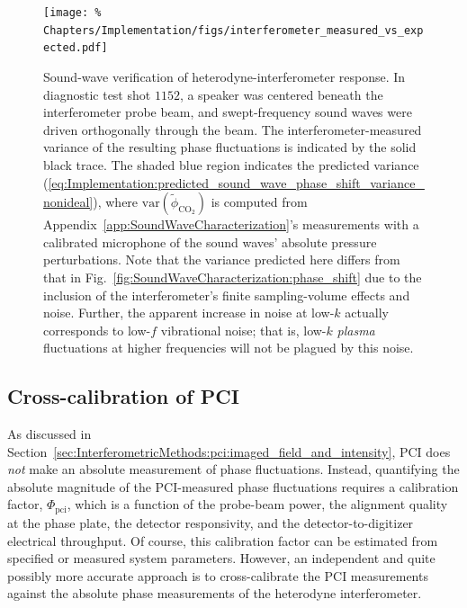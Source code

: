 \begin{figure}
  \centering
  \texttt{[image: \%
    Chapters/Implementation/figs/interferometer\_measured\_vs\_expected.pdf]}
  \caption[Sound-wave verification of heterodyne-interferometer response]{%
    Sound-wave verification of heterodyne-interferometer response.
    In diagnostic test shot $1152$,
    a speaker was centered beneath the interferometer probe beam, and
    swept-frequency sound waves were driven orthogonally through the beam.
    The interferometer-measured variance of the resulting phase fluctuations
    is indicated by the solid black trace.
    The shaded blue region indicates the predicted variance
    (\ref{eq:Implementation:predicted_sound_wave_phase_shift_variance_nonideal}),
    where $\text{var}(\tilde{\phi}_{\text{CO}_2})$
    is computed from Appendix~\ref{app:SoundWaveCharacterization}'s
    measurements with a calibrated microphone
    of the sound waves' absolute pressure perturbations.
    Note that the variance predicted here differs from that in
    Fig.~\ref{fig:SoundWaveCharacterization:phase_shift}
    due to the inclusion of the interferometer's
    finite sampling-volume effects and noise.
    Further, the apparent increase in noise at low-$k$
    actually corresponds to low-$f$ vibrational noise;
    that is, low-$k$ \emph{plasma} fluctuations
    at higher frequencies will not be plagued by this noise.
  }
\label{fig:Implementation:interferometer_measured_vs_expected}
\end{figure}


\subsection{Cross-calibration of PCI}
\label{sec:Implementation:Calibration:pci}
As discussed in
Section~\ref{sec:InterferometricMethods:pci:imaged_field_and_intensity},
PCI does \emph{not} make an absolute measurement of phase fluctuations.
Instead, quantifying the absolute magnitude
of the PCI-measured phase fluctuations
requires a calibration factor, $\Phi_{\text{pci}}$,
which is a function of
the probe-beam power,
the alignment quality at the phase plate,
the detector responsivity, and
the detector-to-digitizer electrical throughput.
Of course, this calibration factor can be estimated
from specified or measured system parameters.
However, an independent and quite possibly more accurate approach
is to cross-calibrate the PCI measurements
against the absolute phase measurements
of the heterodyne interferometer.

